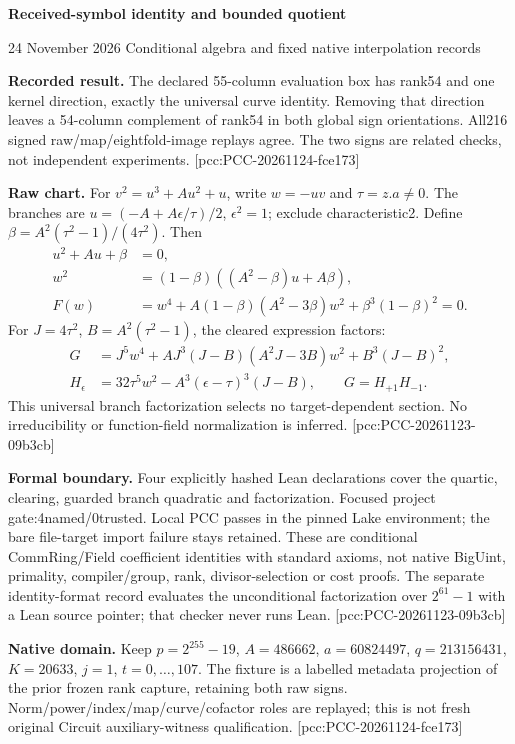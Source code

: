 \documentclass[10pt]{article}
\begin{document}
{\Large\bfseries\color{ink} Received-symbol identity and bounded quotient}\par
{\small 24 November 2026 \quad Conditional algebra and fixed native interpolation records}

\textbf{Recorded result.} The declared 55-column evaluation box has rank54
and one kernel direction, exactly the universal curve identity. Removing
that direction leaves a 54-column complement of rank54 in both global sign
orientations. All216 signed raw/map/eightfold-image replays agree. The two
signs are related checks, not independent experiments.
[pcc:PCC-20261124-fce173]

\textbf{Raw chart.} For $v^2=u^3+Au^2+u$, write $w=-uv$ and
$\tau=z.a\ne0$. The branches are
$u=(-A+A\epsilon/\tau)/2$, $\epsilon^2=1$; exclude characteristic2.
Define $\beta=A^2(\tau^2-1)/(4\tau^2)$. Then
\begin{align*}
u^2+Au+\beta&=0,\\
w^2&=(1-\beta)((A^2-\beta)u+A\beta),\\
F(w)&=w^4+A(1-\beta)(A^2-3\beta)w^2+\beta^3(1-\beta)^2=0.
\end{align*}
For $J=4\tau^2$, $B=A^2(\tau^2-1)$, the cleared expression factors:
\begin{align*}
G&=J^5w^4+AJ^3(J-B)(A^2J-3B)w^2+B^3(J-B)^2,\\
H_\epsilon&=32\tau^5w^2-A^3(\epsilon-\tau)^3(J-B),\qquad
G=H_{+1}H_{-1}.
\end{align*}
This universal branch factorization selects no target-dependent section.
No irreducibility or function-field normalization is inferred.
[pcc:PCC-20261123-09b3cb]

\textbf{Formal boundary.} Four explicitly hashed Lean declarations cover the
quartic, clearing, guarded branch quadratic and factorization. Focused project
gate:4named/0trusted. Local PCC passes in the pinned Lake environment;
the bare file-target import failure stays retained. These are conditional
CommRing/Field coefficient identities with standard axioms, not native
BigUint, primality, compiler/group, rank, divisor-selection or cost proofs.
The separate identity-format record evaluates the unconditional factorization
over $2^{61}-1$ with a Lean source pointer; that checker never runs Lean.
[pcc:PCC-20261123-09b3cb]

\textbf{Native domain.} Keep $p=2^{255}-19$, $A=486662$, $a=60824497$,
$q=213156431$, $K=20633$, $j=1$, $t=0,\ldots,107$. The fixture is a
labelled metadata projection of the prior frozen rank capture, retaining
both raw signs. Norm/power/index/map/curve/cofactor roles are replayed;
this is not fresh original Circuit auxiliary-witness qualification.
[pcc:PCC-20261124-fce173]
\end{document}
